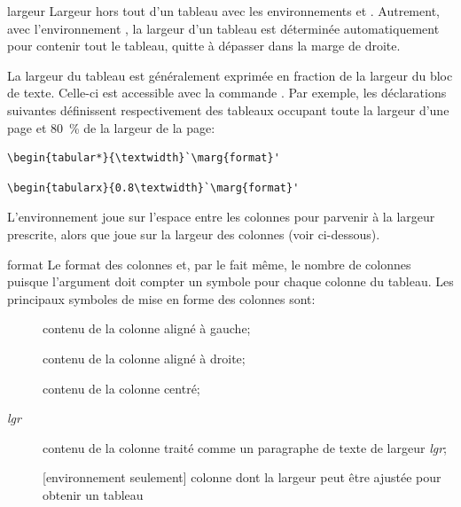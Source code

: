 \begin{list}{}{%
    \setlength{\labelsep}{1.5ex}
    \setlength{\leftmargin}{\labelwidth}
    \addtolength{\leftmargin}{\labelsep}
    \setlength{\parsep}{0.5ex plus0.2ex minus0.2ex}
    \setlength{\itemsep}{0.3ex}
    \renewcommand{\makelabel}[1]{\meta{#1}\hfill}}
%
\item[largeur] Largeur hors tout d'un tableau avec les
  environnements  et . Autrement,
  avec l'environnement , la largeur d'un tableau est
  déterminée automatiquement pour contenir tout le tableau,
  quitte à dépasser dans la marge de droite.

  La largeur du tableau est généralement exprimée en fraction de la
  largeur du bloc de texte. Celle-ci est accessible avec la commande
  . Par exemple, les déclarations suivantes
  définissent respectivement des tableaux occupant toute la largeur
  d'une page et 80~\% de la largeur de la page:
\begin{lstlisting}
\begin{tabular*}{\textwidth}`\marg{format}'
\end{lstlisting}
\begin{lstlisting}
\begin{tabularx}{0.8\textwidth}`\marg{format}'
\end{lstlisting}
  L'environnement  joue sur l'espace entre les colonnes
  pour parvenir à la largeur prescrite, alors que  joue
  sur la largeur des colonnes (voir ci-dessous).
\item[format] Le format des colonnes et, par le fait même, le nombre
  de colonnes puisque l'argument doit compter un symbole pour chaque
  colonne du tableau. Les principaux symboles de mise en forme des
  colonnes sont:
  \begin{description}
  \item[\normalfont{}] contenu de la colonne aligné à gauche;
  \item[\normalfont{}] contenu de la colonne aligné à droite;
  \item[\normalfont{}] contenu de la colonne centré;
  \item[\normalfont{}\textit{lgr}\code{\}}] contenu de la colonne traité comme un
    paragraphe de texte de largeur \textit{lgr};
  \item[\normalfont{}] [environnement  seulement]
    colonne dont la largeur peut être ajustée pour obtenir un tableau

\end{description}
\end{list}
